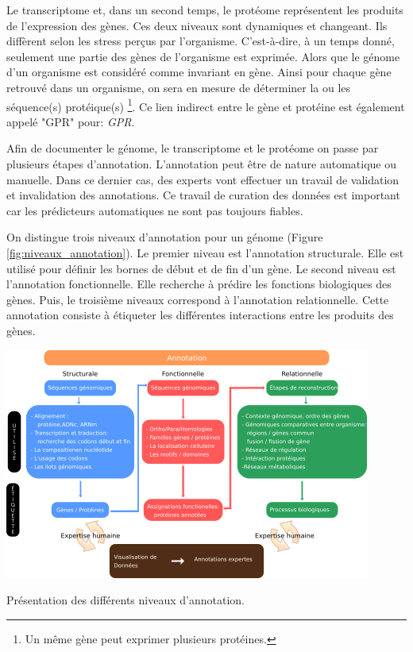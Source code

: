 \begin{refsection}
    Le transcriptome et, dans un second temps, le protéome représentent les produits de l'expression des gènes. Ces deux niveaux sont dynamiques et changeant. Ils diffèrent selon les stress perçus par l'organisme. C'est-à-dire, à un temps donné, seulement une partie des gènes de l'organisme est exprimée. Alors que le génome d'un organisme est considéré comme invariant en gène. Ainsi pour chaque gène retrouvé dans un organisme, on sera en mesure de déterminer la ou les séquence(s) protéique(s) \footnote{Un même gène peut exprimer plusieurs protéines.}. Ce lien indirect entre le gène et protéine est également appelé "\acrshort{GPR}" pour: \textit{\acrfull{GPR}}.
    
    Afin de documenter le génome, le transcriptome et le protéome on passe par plusieurs étapes d’annotation. L’annotation peut être de nature automatique ou manuelle. Dans ce dernier cas, des experts vont effectuer un travail de validation et invalidation des annotations. Ce travail de curation des données est important car les prédicteurs automatiques ne sont pas toujours fiables.
    
    On distingue trois niveaux d’annotation pour un génome (Figure \ref{fig:niveaux_annotation}). Le premier niveau est l’annotation structurale. Elle est utilisé pour définir les bornes de début et de fin d’un gène.  Le second niveau est l’annotation fonctionnelle. Elle recherche à prédire les fonctions biologiques des gènes. Puis, le troisième niveaux correspond à l’annotation relationnelle. Cette annotation consiste à étiqueter les différentes interactions entre les produits des gènes.
    
    \begin{shadedfigure}
        \centering
        \includegraphics[width=\textwidth]{img/niveaux_annotation.png}
        \caption{Présentation des différents niveaux d’annotation.}
        \label{fig:niveaux_annotation}
    \end{shadedfigure}
    

\end{refsection}
